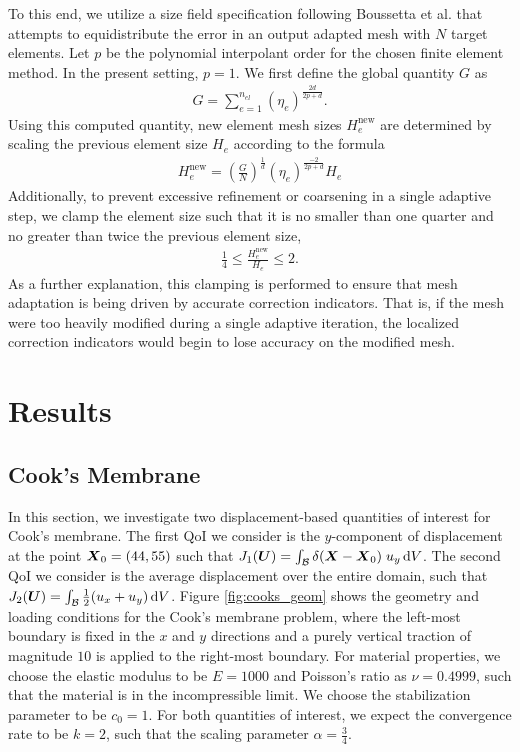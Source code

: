 To this end, we utilize a size field specification following Boussetta et al.
\cite{boussetta2006adaptive} that attempts to equidistribute the error in an
output adapted mesh with $N$ target elements. Let $p$ be the polynomial
interpolant order for the chosen finite element method. In the present
setting, $p=1$. We first define the global quantity $G$ as
%
\begin{gather}
G = \sum_{e=1}^{n_{el}} ( \eta_e ) ^{\frac{2d}{2p+d}}.
\label{eq:mech_global_size_quantity}
\end{gather}
%
Using this computed quantity, new element mesh sizes $H_e^{\text{new}}$ are
determined by scaling the previous element size $H_e$ according to the
formula
%
\begin{gather}
H_e^{\text{new}} = \left( \frac{G}{N} \right)^{\frac{1}{d}}
( \eta_e )^{\frac{-2}{2p + d}} H_e
\label{eq:mech_size_field}
\end{gather}
%
Additionally, to prevent excessive refinement or coarsening in a single
adaptive step, we clamp the element size such that it is no smaller than
one quarter and no greater than twice the previous element size,
%
\begin{gather}
\frac14 \leq \frac{H_e^{\text{new}}}{H_e} \leq 2.
\label{eq:mech_size_clamping}
\end{gather}
%
As a further explanation, this clamping is performed to ensure that mesh
adaptation is being driven by accurate correction indicators. That is,
if the mesh were too heavily modified during a single adaptive iteration,
the localized correction indicators would begin to lose accuracy on the
modified mesh.

\section{Results}

\subsection{Cook's Membrane}

In this section, we investigate two displacement-based quantities of
interest for Cook's membrane. The first QoI we consider is
the $y$-component of displacement at the point $\boldsymbol{X}_0 = (44,55)$ such
that $J_1(\boldsymbol{U}) = \int_{\mathcal{B}} \delta(\boldsymbol{X} - \boldsymbol{X}_0) \; u_y \, \text{d} V$. 
The second QoI we consider is the average displacement
over the entire domain, such that $J_2(\boldsymbol{U}) = \int_{\mathcal{B}} \frac12 (u_x + u_y)
\, \text{d} V$. Figure \ref{fig:cooks_geom} shows the geometry and loading
conditions for the Cook's membrane problem, where the left-most boundary
is fixed in the $x$ and $y$ directions and a purely vertical traction of
magnitude $10$ is applied to the right-most boundary. For material
properties, we choose the elastic modulus to be $E=1000$ and Poisson's
ratio as $\nu = 0.4999$, such that the material is in the incompressible
limit. We choose the stabilization parameter to be $c_0 = 1$. For both
quantities of interest, we expect the convergence rate to be $k = 2$, such
that the scaling parameter $\alpha = \frac34$.


